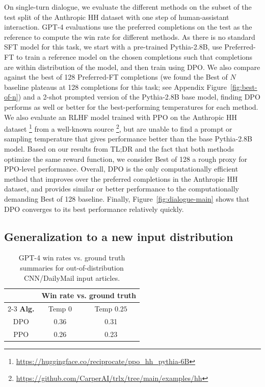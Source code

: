 \documentclass{article}
\begin{document}
On single-turn dialogue, we evaluate the different methods on the subset of the test split of the Anthropic HH dataset \citep{bai2022training} with one step of human-assistant interaction. GPT-4 evaluations use the preferred completions on the test as the reference to compute the win rate for different methods. As there is no standard SFT model for this task, we start with a pre-trained Pythia-2.8B, use Preferred-FT to train a reference model on the chosen completions such that completions are within distribution of the model, and then train using DPO. We also compare against the best of 128 Preferred-FT completions (we found the Best of $N$ baseline plateaus at 128 completions for this task; see Appendix Figure~\ref{fig:best-of-n}) and a 2-shot prompted version of the Pythia-2.8B base model, finding DPO performs as well or better for the best-performing temperatures for each method. We also evaluate an RLHF model trained with PPO on the Anthropic HH dataset \footnote{\url{https://huggingface.co/reciprocate/ppo_hh_pythia-6B}} from a well-known source \footnote{\url{https://github.com/CarperAI/trlx/tree/main/examples/hh}}, but are unable to find a prompt or sampling temperature that gives performance better than the base Pythia-2.8B model. Based on our results from TL;DR and the fact that both methods optimize the same reward function, we consider Best of 128 a rough proxy for PPO-level performance. Overall, DPO is the only computationally efficient method that improves over the preferred completions in the Anthropic HH dataset, and provides similar or better performance to the computationally demanding Best of 128 baseline. Finally, Figure~\ref{fig:dialogue-main} shows that DPO converges to its best performance relatively quickly.

\subsection{Generalization to a new input distribution}

\begin{table}
    \small
    \vspace{-10mm}
    \begin{tabular}{ccc}
        \toprule
        & \multicolumn{2}{c}{\textbf{Win rate vs. ground truth}} \\
        \cmidrule(lr){2-3}
        \textbf{Alg.} & Temp $0$ & Temp $0.25$ \\
        \midrule
        DPO & 0.36 & 0.31 \\
        PPO & 0.26 & 0.23 \\
        \bottomrule
    \end{tabular}
    \caption{GPT-4 win rates vs. ground truth summaries for out-of-distribution CNN/DailyMail input articles.}
    \vspace{-3mm}
    \label{tab:ood}
\end{table}
\end{document}

